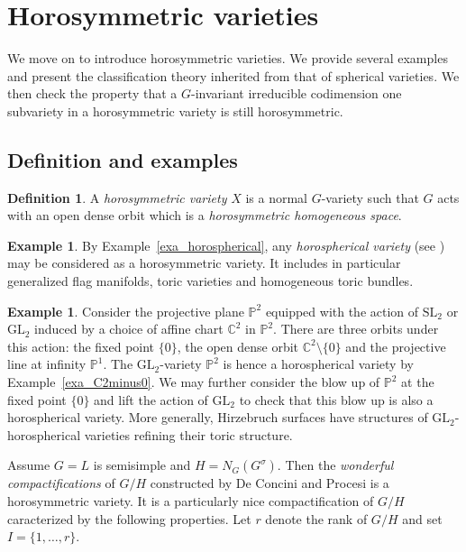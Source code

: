 \documentclass{amsart}
\theoremstyle{definition}
\newtheorem{defn}[thm]{Definition}
\newtheorem{exa}[thm]{Example}
\begin{document}
\section{Horosymmetric varieties}

\label{sec_varieties}

We move on to introduce horosymmetric varieties. We provide several examples and 
present the classification theory inherited from that of spherical varieties.
We then check the property that a $G$-invariant irreducible codimension one 
subvariety in a horosymmetric variety is still horosymmetric. 

\subsection{Definition and examples}

\begin{defn}
A \emph{horosymmetric variety} $X$ is a normal $G$-variety such that 
$G$ acts with an open dense orbit which is a \emph{horosymmetric homogeneous 
space}. 
\end{defn}

\begin{exa} 
By Example~\ref{exa_horospherical}, any 
\emph{horospherical variety} (see \cite{Pas08}) 
may be considered as a horosymmetric variety. 
It includes in particular generalized flag manifolds, toric varieties 
and homogeneous toric bundles.  
\end{exa}

\begin{exa}
\label{exa_P2_horospherical}
Consider the projective plane $\mathbb{P}^2$ equipped with the action 
of $\mathrm{SL}_2$ or $\mathrm{GL}_2$ induced by a choice of affine chart 
$\mathbb{C}^2$ in $\mathbb{P}^2$. There are three orbits under this action: 
the fixed point $\{0\}$, the open dense orbit $\mathbb{C}^2\setminus \{0\}$ 
and the projective line at infinity $\mathbb{P}^1$. The $\mathrm{GL}_2$-variety 
$\mathbb{P}^2$ is hence a horospherical variety by Example~\ref{exa_C2minus0}. 
We may further consider the blow up of $\mathbb{P}^2$ at the fixed point 
$\{0\}$ and lift the action of $\mathrm{GL}_2$ to check that this blow up is also
a horospherical variety.  
More generally, Hirzebruch surfaces have structures of $\mathrm{GL}_2$-horospherical 
varieties refining their toric structure.
\end{exa}


Assume $G=L$ is semisimple and $H=N_G(G^{\sigma})$.
Then the \emph{wonderful compactifications} of $G/H$ constructed by De Concini 
and Procesi \cite{DCP83} is a horosymmetric variety.
It is a particularly nice compactification of $G/H$ caracterized by 
the following properties. 
Let $r$ denote the rank of $G/H$ and set $I=\{1,\ldots,r\}$.
\end{document}
